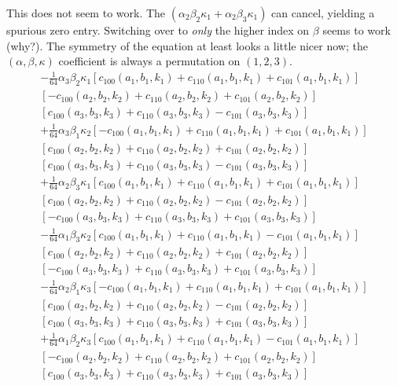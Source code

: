 \documentclass[12pt,onecolumn]{article}
\begin{document}
This does not seem to work. The $(\alpha_2 \beta_2 \kappa_1 + \alpha_2 \beta_3 \kappa_1)$ can cancel, yielding a spurious zero entry. Switching over to {\em only} the higher index on $\beta$ seems to work (why?). The symmetry of the equation at least looks a little nicer now; the $(\alpha, \beta, \kappa)$ coefficient is always a permutation on $(1,2,3)$.
\begin{equation}
\begin{split}
-\frac{1}{64} \alpha_3 \beta_2 \kappa_1 
   \left[c_{100}(a_1, b_1, k_1) + 
    c_{110}(a_1, b_1, k_1) + 
    c_{101}(a_1, b_1, k_1)\right]\\
   \left[-c_{100}(a_2, b_2, k_2) + 
    c_{110}(a_2, b_2, k_2) + 
    c_{101}(a_2, b_2, k_2)\right]\\
   \left[c_{100}(a_3, b_3, k_3) + 
    c_{110}(a_3, b_3, k_3) - 
    c_{101}(a_3, b_3, k_3)\right] \\ 
+ \frac{1}{64} \alpha_3 \beta_1 \kappa_2 \left[-c_{100}(a_1, b_1, k_1) + c_{110}(a_1, b_1, k_1) + 
    c_{101}(a_1, b_1, k_1)\right]\\ 
   \left[c_{100}(a_2, b_2, k_2) + 
    c_{110}(a_2, b_2, k_2) + 
    c_{101}(a_2, b_2, k_2)\right]\\
   \left[c_{100}(a_3, b_3, k_3) + 
    c_{110}(a_3, b_3, k_3) - 
    c_{101}(a_3, b_3, k_3)\right] \\
+\frac{1}{64} \alpha_2 \beta_3 \kappa_1 \left[c_{100}(a_1, b_1, k_1) + 
    c_{110}(a_1, b_1, k_1) + 
    c_{101}(a_1, b_1, k_1)\right]\\
   \left[c_{100}(a_2, b_2, k_2) + 
    c_{110}(a_2, b_2, k_2) - 
    c_{101}(a_2, b_2, k_2)\right]\\
   \left[-c_{100}(a_3, b_3, k_3) + 
    c_{110}(a_3, b_3, k_3) + 
    c_{101}(a_3, b_3, k_3)\right] \\
- \frac{1}{64} \alpha_1 \beta_3 \kappa_2 \left[c_{100}(a_1, b_1, k_1) + 
    c_{110}(a_1, b_1, k_1) - 
    c_{101}(a_1, b_1, k_1)\right]\\
   \left[c_{100}(a_2, b_2, k_2) + 
    c_{110}(a_2, b_2, k_2) + 
    c_{101}(a_2, b_2, k_2)\right]\\
   \left[-c_{100}(a_3, b_3, k_3) + 
    c_{110}(a_3, b_3, k_3) + 
    c_{101}(a_3, b_3, k_3)\right] \\
- \frac{1}{64} \alpha_2 \beta_1 \kappa_3 \left[-c_{100}(a_1, b_1, k_1) + 
 c_{110}(a_1, b_1, k_1) + 
    c_{101}(a_1, b_1, k_1)\right]\\
   \left[c_{100}(a_2, b_2, k_2) + 
    c_{110}(a_2, b_2, k_2) - 
    c_{101}(a_2, b_2, k_2)\right]\\
   \left[c_{100}(a_3, b_3, k_3) + 
    c_{110}(a_3, b_3, k_3) + 
    c_{101}(a_3, b_3, k_3)\right] \\
+ \frac{1}{64} \alpha_1 \beta_2 \kappa_3 \left[c_{100}(a_1, b_1, k_1) + 
    c_{110}(a_1, b_1, k_1) - 
    c_{101}(a_1, b_1, k_1)\right]\\
   \left[-c_{100}(a_2, b_2, k_2) + 
    c_{110}(a_2, b_2, k_2) + 
    c_{101}(a_2, b_2, k_2)\right]\\
   \left[c_{100}(a_3, b_3, k_3) + 
    c_{110}(a_3, b_3, k_3) + 
    c_{101}(a_3, b_3, k_3)\right]
\end{split}
\end{equation}
\end{document}
